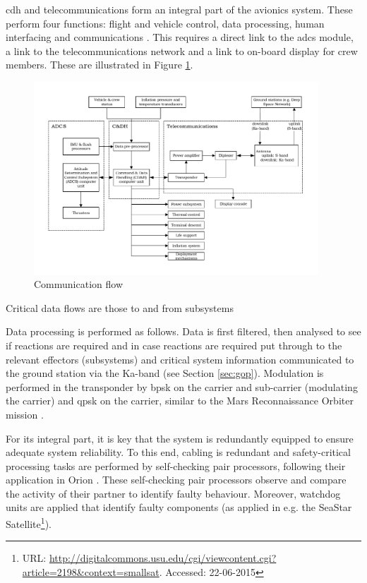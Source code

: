 \gls{cdh} and telecommunications form an integral part of the avionics system. These perform four functions: flight and vehicle control, data processing, human interfacing and communications \cite{Eger2008}. This requires a direct link to the \gls{adcs} module, a link to the telecommunications network and a link to on-board display for crew members. These are illustrated in Figure \ref{fig:cdhflow}.

\begin{figure}[h]
		\centering
		\includegraphics[width=0.95\textwidth]{./Figure/CrewModule/CDH.pdf}
		\caption{Communication flow}
		\label{fig:cdhflow}
\end{figure}

Critical data flows are those to and from subsystems

Data processing is performed as follows. Data is first filtered, then analysed to see if reactions are required and in case reactions are required put through to the relevant effectors (subsystems) and critical system information communicated to the ground station via the Ka-band (see Section \ref{sec:gop}). Modulation is performed in the transponder by \gls{bpsk} on the carrier and sub-carrier (modulating the carrier) and \gls{qpsk} on the carrier, similar to the Mars Reconnaissance Orbiter mission \cite{Taylor2006}.

For its integral part, it is key that the system is redundantly equipped to ensure adequate system reliability. To this end, cabling is redundant and safety-critical processing tasks are performed by self-checking pair processors, following their application in Orion \cite{Eger2008}. These self-checking pair processors observe and compare the activity of their partner to identify faulty behaviour. Moreover, watchdog units are applied that identify faulty components (as applied in e.g. the SeaStar Satellite\footnote{URL: \url{http://digitalcommons.usu.edu/cgi/viewcontent.cgi?article=2198&context=smallsat}. Accessed: 22-06-2015}).

